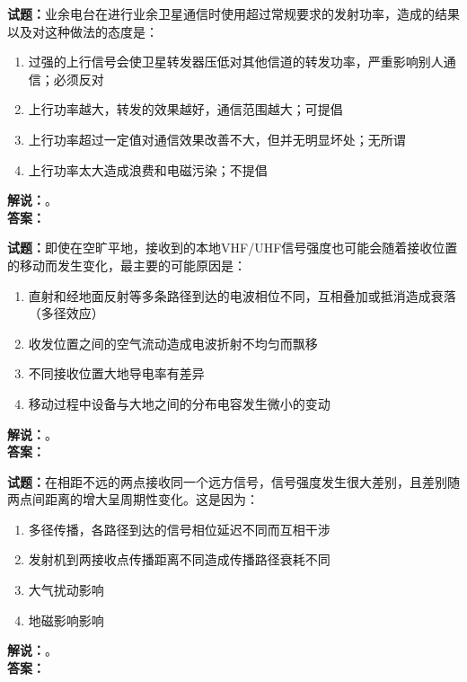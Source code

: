 \documentclass{ctexbook}
\begin{document}
\vspace{\baselineskip}

\noindent\textbf{试题：}业余电台在进行业余卫星通信时使用超过常规要求的发射功率，造成的结果以及对这种做法的态度是：
\begin{enumerate}[leftmargin=3em]
  \item 过强的上行信号会使卫星转发器压低对其他信道的转发功率，严重影响别人通信；必须反对
  \item 上行功率越大，转发的效果越好，通信范围越大；可提倡
  \item 上行功率超过一定值对通信效果改善不大，但并无明显坏处；无所谓
  \item 上行功率太大造成浪费和电磁污染；不提倡
\end{enumerate}
\noindent\textbf{解说：}\textbf{}。\\\noindent\textbf{答案：}

\vspace{\baselineskip}

\noindent\textbf{试题：}即使在空旷平地，接收到的本地VHF/UHF信号强度也可能会随着接收位置的移动而发生变化，最主要的可能原因是：
\begin{enumerate}[leftmargin=3em]
  \item 直射和经地面反射等多条路径到达的电波相位不同，互相叠加或抵消造成衰落（多径效应）
  \item 收发位置之间的空气流动造成电波折射不均匀而飘移
  \item 不同接收位置大地导电率有差异
  \item 移动过程中设备与大地之间的分布电容发生微小的变动
\end{enumerate}
\noindent\textbf{解说：}\textbf{}。\\\noindent\textbf{答案：}

\vspace{\baselineskip}

\noindent\textbf{试题：}在相距不远的两点接收同一个远方信号，信号强度发生很大差别，且差别随两点间距离的增大呈周期性变化。这是因为：
\begin{enumerate}[leftmargin=3em]
  \item 多径传播，各路径到达的信号相位延迟不同而互相干涉
  \item 发射机到两接收点传播距离不同造成传播路径衰耗不同
  \item 大气扰动影响
  \item 地磁影响影响
\end{enumerate}
\noindent\textbf{解说：}\textbf{}。\\\noindent\textbf{答案：}
\end{document}

